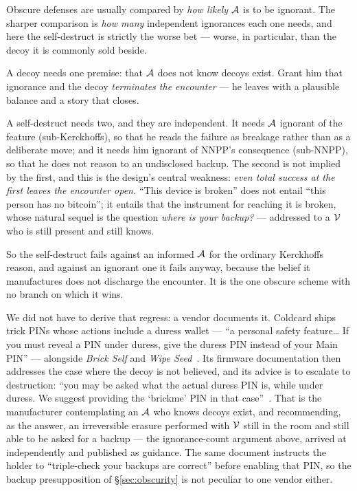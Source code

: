 \begin{remark}
\label{rem:two-ignorances}
Obscure defenses are usually compared by \emph{how likely} $\mathcal{A}$ is to be
ignorant. The sharper comparison is \emph{how many} independent ignorances each
one needs, and here the self-destruct is strictly the worse bet --- worse, in
particular, than the decoy it is commonly sold beside.

A decoy needs one premise: that $\mathcal{A}$ does not know decoys exist. Grant him
that ignorance and the decoy \emph{terminates the encounter} --- he leaves with a
plausible balance and a story that closes.

A self-destruct needs two, and they are independent. It needs $\mathcal{A}$ ignorant
of the feature (sub-Kerckhoffs), so that he reads the failure as breakage rather
than as a deliberate move; and it needs him ignorant of NNPP's consequence
(sub-NNPP), so that he does not reason to an undisclosed backup. The second is
not implied by the first, and this is the design's central weakness: \emph{even
total success at the first leaves the encounter open.} ``This device is broken''
does not entail ``this person has no bitcoin''; it entails that the instrument
for reaching it is broken, whose natural sequel is the question \emph{where is
your backup?} --- addressed to a $\mathcal{V}$ who is still present and still knows.

So the self-destruct fails against an informed $\mathcal{A}$ for the ordinary
Kerckhoffs reason, and against an ignorant one it fails anyway, because the
belief it manufactures does not discharge the encounter. It is the one obscure
scheme with no branch on which it wins.

We did not have to derive that regress: a vendor documents it. Coldcard ships
trick PINs whose actions include a duress wallet --- ``a personal safety
feature\ldots{} If you must reveal a PIN under duress, give the duress PIN
instead of your Main PIN'' --- alongside \emph{Brick Self} and \emph{Wipe
Seed}~\cite{coldcard-trick-pins}. Its firmware documentation then addresses the
case where the decoy is not believed, and its advice is to escalate to
destruction: ``you may be asked what the actual duress PIN is, while under
duress. We suggest providing the `brickme' PIN in that
case''~\cite{coldcard-pin-entry}. That is the manufacturer contemplating an
$\mathcal{A}$ who knows decoys exist, and recommending, as the answer, an
irreversible erasure performed with $\mathcal{V}$ still in the room and still able
to be asked for a backup --- the ignorance-count argument above, arrived at
independently and published as guidance. The same document instructs the holder
to ``triple-check your backups are correct'' before enabling that PIN, so the
backup presupposition of \S\ref{sec:obscurity} is not peculiar to one vendor
either.


\end{remark}
